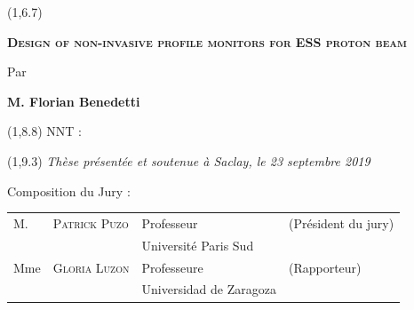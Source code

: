 \begin{titlepage}
  \begin{textblock}{14}(1,6.7)
    \begin{center}	
      \Large \textsc{\textcolor{ESSColor}{ \textbf{Design of non-invasive profile monitors for ESS proton beam}}}\par          
      \large Par\par  \large \textbf{M. Florian Benedetti} \par
    \end{center}
  \end{textblock}
  
  \begin{textblock}{13}(1,8.8)
    NNT : 
  \end{textblock}
  
  \begin{textblock}{14}(1,9.3)
    \vspace{1.5cm}
    \hspace{1cm}\textit{Thèse présentée et soutenue à Saclay, le 23 septembre 2019}
    \vspace{0.5cm}
    \par
    \hspace{1cm}Composition du Jury :
    \begin{center}
      \begin{tabular}{llll}
        M.    & \textsc{Patrick Puzo}        & Professeur              & (Président du jury)    \\
        \null & \null                        & Université Paris Sud    &                        \\   
        
        Mme   & \textsc{Gloria Luzon}        & Professeure             & (Rapporteur)           \\
        \null & \null                        & Universidad de Zaragoza &                        \\ 
        

\end{tabular}
\end{center}
\end{textblock}
\end{titlepage}

